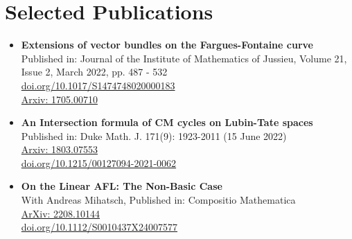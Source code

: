 \documentclass[a4paper,10pt]{article}
\begin{document}
\section*{Selected Publications}
\begin{itemize}
    \item \textbf{Extensions of vector bundles on the Fargues-Fontaine curve} \\
    Published in: Journal of the Institute of Mathematics of Jussieu, Volume 21, Issue 2, March 2022, pp. 487 - 532 \\ \href{https://doi.org/10.1017/S1474748020000183}{doi.org/10.1017/S1474748020000183} \\
    \href{https://arxiv.org/abs/1705.00710}{Arxiv: 1705.00710}
    \item \textbf{An Intersection formula of CM cycles on Lubin-Tate spaces} \\
    Published in: Duke Math. J. 171(9): 1923-2011 (15 June 2022) \\
    \href{https://arxiv.org/abs/1803.07553}{Arxiv: 1803.07553}\\
    \href{https://doi.org/10.1215/00127094-2021-0062}{doi.org/10.1215/00127094-2021-0062}
    \item \textbf{On the Linear AFL: The Non-Basic Case} \\
    With Andreas Mihatsch, 
	Published in: Compositio Mathematica \\
    \href{https://arxiv.org/abs/2208.10144}{ArXiv: 2208.10144}\\
	\href{https://doi.org/10.1112/S0010437X24007577}{doi.org/10.1112/S0010437X24007577}
\end{itemize}
\end{document}
